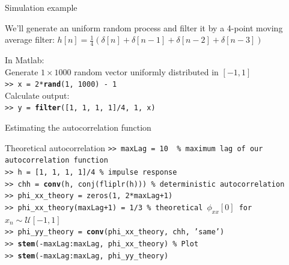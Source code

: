 \documentclass[10pt, handout]{beamer}
\begin{document}
\begin{frame}{Simulation example}

We'll generate an uniform random process and filter it by a 4-point moving average filter: $h[n] = \frac{1}{4}(\delta[n] + \delta[n-1] + \delta[n-2] + \delta[n-3])$

\begin{center}
\end{center}
In Matlab:\\
Generate $1\times 1000$ random vector uniformly distributed in $[-1, 1]$ \\
\texttt{>> x = 2*\textbf{rand}(1, 1000) - 1} \\
Calculate output:\\
\texttt{>> y = \textbf{filter}([1, 1, 1, 1]/4, 1, x)}\\
	
\end{frame}

\begin{frame}{Estimating the autocorrelation function}
\begin{block}{Theoretical autocorrelation} 
	\texttt{>> maxLag = 10 {\color{matlabcomment} \% maximum lag of our autocorrelation function}}\\
	\texttt{>> h = [1, 1, 1, 1]/4 {\color{matlabcomment}\% impulse response}} \\
	\texttt{>> chh = \textbf{conv}(h, conj(fliplr(h))) {\color{matlabcomment}\% deterministic autocorrelation}} \\
	\texttt{>> phi\_xx\_theory = zeros(1, 2*maxLag+1)} \\
	\texttt{>> phi\_xx\_theory(maxLag+1) = 1/3 {\color{matlabcomment}\% theoretical $\phi_{xx}[0]$ for $x_n\sim\mathcal{U}[-1, 1]$}} \\
	\texttt{>> phi\_yy\_theory = \textbf{conv}(phi\_xx\_theory, chh, 'same')} \\
	\texttt{>> \textbf{stem}(-maxLag:maxLag, phi\_xx\_theory) {\color{matlabcomment}\% Plot}} \\
	\texttt{>> \textbf{stem}(-maxLag:maxLag, phi\_yy\_theory)}
\end{block}
\end{frame}
\end{document}
